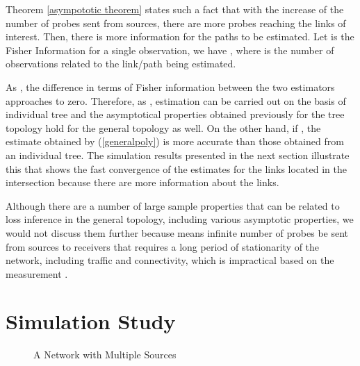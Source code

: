 \documentclass[10pt,twocolumn]{IEEEtran}
\begin{document}
Theorem  \ref{asympototic theorem} states such a fact that with the
increase of the number of probes sent from sources, there are more
probes reaching the links of interest. Then, there is more information
for the paths to be estimated. Let  is the Fisher
Information for a single observation, we have
, where  is the number of observations
related to the link/path being estimated.

As , the difference in terms of Fisher
information between the two estimators approaches to zero. Therefore,
as , estimation can be carried out on the basis
of individual tree and the asymptotical properties obtained previously
for the tree topology \cite{CDHT99} hold for the general topology as
well. On the other hand, if , the estimate obtained by
(\ref{generalpoly}) is more accurate than those obtained from an
individual tree. The simulation results presented in the next section
illustrate this that shows the fast convergence of the estimates for
the links located in the intersection because there are more
information about the links.

 Although there are a number of large sample properties that can
be related to loss inference in the general topology, including
various asymptotic properties, we would not discuss them further
because  means infinite number of probes be sent
from sources to receivers that requires a long period of stationarity
of the network, including traffic and connectivity, which is
impractical based on the measurement \cite{PAX99}.


\section{Simulation Study}


\begin{figure}
\centerline{}
\caption{A Network with Multiple Sources} \label{multisource}
\end{figure}
\end{document}
